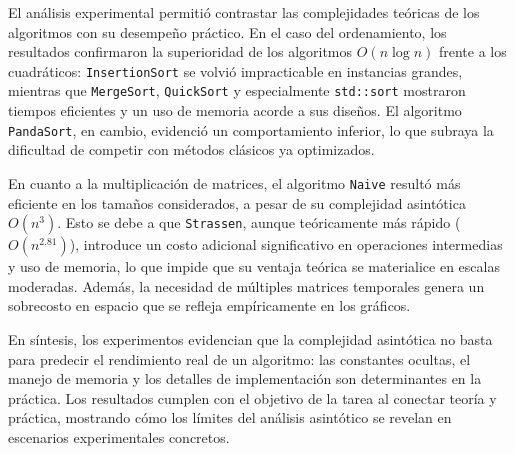 El análisis experimental permitió contrastar las complejidades teóricas de los algoritmos con su desempeño práctico. 
En el caso del ordenamiento, los resultados confirmaron la superioridad de los algoritmos $O(n\log n)$ frente a los cuadráticos: 
\texttt{InsertionSort} se volvió impracticable en instancias grandes, mientras que \texttt{MergeSort}, \texttt{QuickSort} y especialmente \texttt{std::sort} 
mostraron tiempos eficientes y un uso de memoria acorde a sus diseños. 
El algoritmo \texttt{PandaSort}, en cambio, evidenció un comportamiento inferior, lo que subraya la dificultad de competir con métodos clásicos ya optimizados.

En cuanto a la multiplicación de matrices, el algoritmo \texttt{Naive} resultó más eficiente en los tamaños considerados, 
a pesar de su complejidad asintótica $O(n^3)$. 
Esto se debe a que \texttt{Strassen}, aunque teóricamente más rápido ($O(n^{2.81})$), introduce un costo adicional significativo en operaciones intermedias 
y uso de memoria, lo que impide que su ventaja teórica se materialice en escalas moderadas. 
Además, la necesidad de múltiples matrices temporales genera un sobrecosto en espacio que se refleja empíricamente en los gráficos.

En síntesis, los experimentos evidencian que la complejidad asintótica no basta para predecir el rendimiento real de un algoritmo: 
las constantes ocultas, el manejo de memoria y los detalles de implementación son determinantes en la práctica. 
Los resultados cumplen con el objetivo de la tarea al conectar teoría y práctica, mostrando cómo los límites del análisis asintótico se revelan 
en escenarios experimentales concretos.
